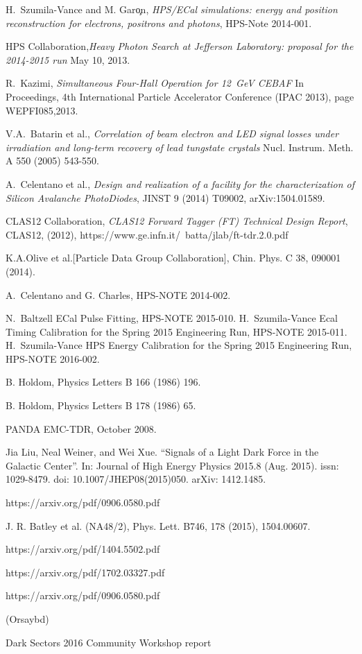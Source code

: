 \documentclass[12pt]{report}
\begin{document}
\begin{thebibliography}{99}
 H.~Szumila-Vance and M. Gar\c on, {\it HPS/ECal simulations: energy and
position reconstruction for electrons, positrons and photons}, HPS-Note 2014-001.

 HPS Collaboration,{\it Heavy Photon Search at Jefferson Laboratory: proposal for the 2014-2015 run} May 10, 2013. %

 R.~Kazimi, {\it Simultaneous Four-Hall Operation for 12~GeV CEBAF} In Proceedings, 4th International Particle Accelerator Conference (IPAC 2013), page WEPFI085,2013.

 V.A.~Batarin et al., {\it Correlation of beam electron and LED signal losses under irradiation and long-term recovery of lead tungstate crystals} Nucl. Instrum. Meth. A 550 (2005) 543-550.

 A.~Celentano et al., {\it Design and realization of a facility for the characterization of Silicon Avalanche PhotoDiodes}, JINST 9 (2014) T09002, arXiv:1504.01589.

 CLAS12 Collaboration, {\it CLAS12 Forward Tagger (FT) Technical Design Report}, CLAS12, (2012), https://www.ge.infn.it/~batta/jlab/ft-tdr.2.0.pdf

 K.A.Olive et al.[Particle Data Group Collaboration], Chin. Phys. C 38, 090001 (2014).

 A.~Celentano and G. Charles, HPS-NOTE 2014-002.

 N.~Baltzell ECal Pulse Fitting, HPS-NOTE 2015-010.
 H.~Szumila-Vance Ecal Timing Calibration for the Spring 2015 Engineering Run, HPS-NOTE 2015-011.
 H.~Szumila-Vance HPS Energy Calibration for the Spring 2015 Engineering Run, HPS-NOTE 2016-002.

 B. Holdom, Physics Letters B 166 (1986) 196. 

 B. Holdom, Physics Letters B 178 (1986) 65. 


 PANDA EMC-TDR, October 2008.

  Jia Liu, Neal Weiner, and Wei Xue. “Signals of a Light Dark Force in the
Galactic Center”. In: Journal of High Energy Physics 2015.8 (Aug. 2015). issn:
1029-8479. doi: 10.1007/JHEP08(2015)050. arXiv: 1412.1485. 

https://arxiv.org/pdf/0906.0580.pdf

 J. R. Batley et al. (NA48/2), Phys. Lett. B746, 178 (2015), 1504.00607.

https://arxiv.org/pdf/1404.5502.pdf

https://arxiv.org/pdf/1702.03327.pdf

https://arxiv.org/pdf/0906.0580.pdf

\bibitem(Orsaybd)

 Dark Sectors 2016 Community Workshop report

\end{thebibliography}
\end{document}
